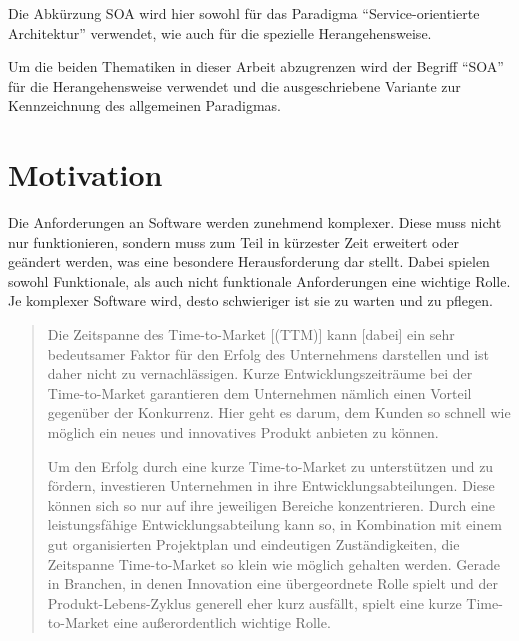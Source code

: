 Die Abkürzung SOA wird hier sowohl für das Paradigma "`Service-orientierte Architektur"' verwendet, wie auch für die spezielle Herangehensweise.

Um die beiden Thematiken in dieser Arbeit abzugrenzen wird der Begriff "`SOA"' für die Herangehensweise verwendet und die ausgeschriebene Variante zur Kennzeichnung des allgemeinen Paradigmas.



\section{Motivation}
\label{sec:motivation}
Die Anforderungen an Software werden zunehmend komplexer. Diese muss nicht nur funktionieren, sondern muss zum Teil in kürzester Zeit erweitert oder geändert werden, was eine besondere Herausforderung dar stellt. Dabei spielen sowohl Funktionale, als auch nicht funktionale Anforderungen eine wichtige Rolle. Je komplexer Software wird, desto schwieriger ist sie zu warten und zu pflegen. 

\begin{quotation}
\frqq Die Zeitspanne des Time-to-Market [(TTM)] kann [dabei] ein sehr bedeutsamer Faktor für den Erfolg des Unternehmens darstellen und ist daher nicht zu vernachlässigen. Kurze Entwicklungszeiträume bei der Time-to-Market garantieren dem Unternehmen nämlich einen Vorteil gegenüber der Konkurrenz. Hier geht es darum, dem Kunden so schnell wie möglich ein neues und innovatives Produkt anbieten zu können.
    
Um den Erfolg durch eine kurze Time-to-Market zu unterstützen und zu fördern, investieren Unternehmen in ihre Entwicklungsabteilungen. Diese können sich so nur auf ihre jeweiligen Bereiche konzentrieren. Durch eine leistungsfähige Entwicklungsabteilung kann so, in Kombination mit einem gut organisierten Projektplan und eindeutigen Zuständigkeiten, die Zeitspanne Time-to-Market so klein wie möglich gehalten werden. Gerade in Branchen, in denen Innovation eine übergeordnete Rolle spielt und der Produkt-Lebens-Zyklus generell eher kurz ausfällt, spielt eine kurze Time-to-Market eine außerordentlich wichtige Rolle.\flqq \cite{ttm}
\end{quotation}

